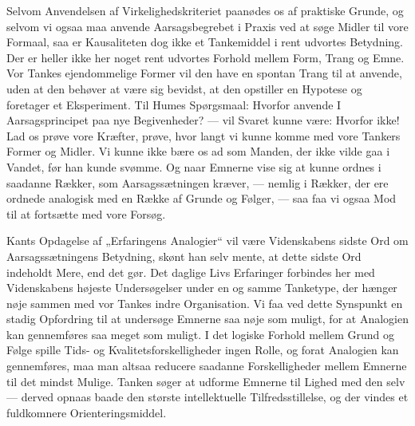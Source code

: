 \documentclass[12pt,a4paper]{book}
\newcommand{\apage}[1]{\marginnote{\footnotesize\textit{[#1]}}}
\begin{document}
Selvom Anvendelsen af Virkelighedskriteriet paanødes os af praktiske Grunde, og
selvom vi ogsaa maa anvende Aarsagsbegrebet i Praxis ved at søge Midler til vore
Formaal, saa er Kausaliteten dog ikke et Tankemiddel i rent udvortes Betydning. Der
er heller ikke her noget rent udvortes Forhold mellem Form, Trang og Emne. Vor
Tankes ejendommelige Former vil den have en spontan Trang til at anvende, uden at
den behøver at være sig bevidst, at den opstiller en Hypotese og foretager et
Eksperiment. Til Humes Spørgsmaal: Hvorfor anvende I Aarsagsprincipet paa nye
Begivenheder? --- vil Svaret kunne være: Hvorfor ikke! Lad os prøve vore Kræfter,
prøve, hvor langt vi kunne komme med vore Tankers Former og Midler. Vi kunne ikke
bære os ad som Manden, der ikke vilde gaa i Vandet, før han kunde svømme. Og naar
Emnerne vise sig at kunne ordnes i saadanne Rækker, som Aarsagssætningen kræver, ---
nemlig i Rækker, der ere ordnede analogisk med en Række af Grunde og Følger, --- saa
faa vi ogsaa Mod til at fortsætte med vore Forsøg.

Kants Opdagelse af „Erfaringens Analogier“ vil være Videnskabens sidste Ord om
Aarsagssætningens Betydning, skønt han selv mente, at dette sidste Ord indeholdt
Mere, end det gør. Det daglige Livs Erfaringer forbindes her med Videnskabens
højeste Undersøgelser under en og samme Tanketype, der hænger nøje sammen med vor
Tankes indre Organisation. Vi faa ved dette Synspunkt en stadig Opfordring til at
undersøge Emnerne saa nøje som muligt, for at \apage{281} Analogien kan gennemføres saa meget
som muligt. I det logiske Forhold mellem Grund og Følge spille Tids- og
Kvalitetsforskelligheder ingen Rolle, og forat Analogien kan gennemføres, maa man
altsaa reducere saadanne Forskelligheder mellem Emnerne til det mindst Mulige.
Tanken søger at udforme Emnerne til Lighed med den selv --- derved opnaas baade den
største intellektuelle Tilfredsstillelse, og der vindes et fuldkomnere
Orienteringsmiddel.
\end{document}
